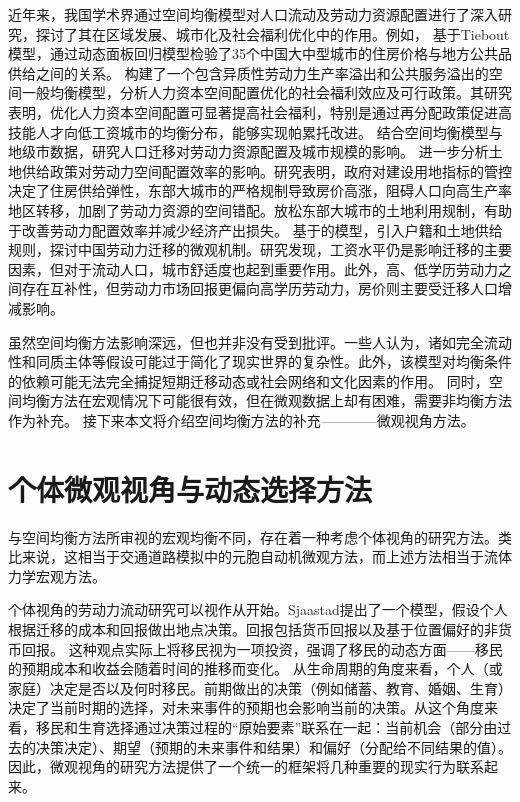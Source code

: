 \documentclass[a4paper, zihao=-4, fontset = mac, oneside]{ctexbook} %
\begin{document}
近年来，我国学术界通过空间均衡模型对人口流动及劳动力资源配置进行了深入研究，探讨了其在区域发展、城市化及社会福利优化中的作用。例如，
\textcite{LiangRuoBingDiFangGongGongPinGongGeiZhongDeTieboutMoXingJiYuZhongGuoChengShiFangJieDeJingYanYanJiu2008}基于Tiebout模型，通过动态面板回归模型检验了35个中国大中型城市的住房价格与地方公共品供给之间的关系。
\textcite{LiuHuaRenLiZiBenKongJianPeiZhiDeSheHuiFuLiXiaoYingYanJiuJiYuLiangHuaKongJianYiBanJunHengMoXingDeFenXi2024}构建了一个包含异质性劳动力生产率溢出和公共服务溢出的空间一般均衡模型，分析人力资本空间配置优化的社会福利效应及可行政策。其研究表明，优化人力资本空间配置可显著提高社会福利，特别是通过再分配政策促进高技能人才向低工资城市的均衡分布，能够实现帕累托改进。
\textcite{WangLiLiWoGuoRenKouQianYiChengBenChengShiGuiMoYuShengChanLu2020}结合空间均衡模型与地级市数据，研究人口迁移对劳动力资源配置及城市规模的影响。
\textcite{WangLiLiTuDiGongGeiFangJieYuLaoDongLiKongJianPeiZhiXiaoLu2023}进一步分析土地供给政策对劳动力空间配置效率的影响。研究表明，政府对建设用地指标的管控决定了住房供给弹性，东部大城市的严格规制导致房价高涨，阻碍人口向高生产率地区转移，加剧了劳动力资源的空间错配。放松东部大城市的土地利用规制，有助于改善劳动力配置效率并减少经济产出损失。
\textcite{ZhaoFangZhongGuoChengShiHuaFaZhanJiYuKongJianJunHengMoXingDeYanJiu2017}基于\textcite{diamondDeterminantsWelfareImplications2016}的模型，引入户籍和土地供给规则，探讨中国劳动力迁移的微观机制。研究发现，工资水平仍是影响迁移的主要因素，但对于流动人口，城市舒适度也起到重要作用。此外，高、低学历劳动力之间存在互补性，但劳动力市场回报更偏向高学历劳动力，房价则主要受迁移人口增减影响。

虽然空间均衡方法影响深远，但也并非没有受到批评。一些人认为，诸如完全流动性和同质主体等假设可能过于简化了现实世界的复杂性。此外，该模型对均衡条件的依赖可能无法完全捕捉短期迁移动态或社会网络和文化因素的作用。
同时，空间均衡方法在宏观情况下可能很有效，但在微观数据上却有困难，需要非均衡方法作为补充。
接下来本文将介绍空间均衡方法的补充————微观视角方法。


\section{个体微观视角与动态选择方法}

与空间均衡方法所审视的宏观均衡不同，存在着一种考虑个体视角的研究方法。类比来说，这相当于交通道路模拟中的元胞自动机微观方法，而上述方法相当于流体力学宏观方法。

个体视角的劳动力流动研究可以视作从\textcite{sjaastadCostsReturnsHuman1962}开始。Sjaastad提出了一个模型，假设个人根据迁移的成本和回报做出地点决策。回报包括货币回报以及基于位置偏好的非货币回报。
这种观点实际上将移民视为一项投资，强调了移民的动态方面——移民的预期成本和收益会随着时间的推移而变化。
从生命周期的角度来看，个人（或家庭）决定是否以及何时移民。前期做出的决策（例如储蓄、教育、婚姻、生育）决定了当前时期的选择，对未来事件的预期也会影响当前的决策。从这个角度来看，移民和生育选择通过决策过程的“原始要素”联系在一起：当前机会（部分由过去的决策决定）、期望（预期的未来事件和结果）和偏好（分配给不同结果的值）。因此，微观视角的研究方法提供了一个统一的框架将几种重要的现实行为联系起来。
\end{document}
